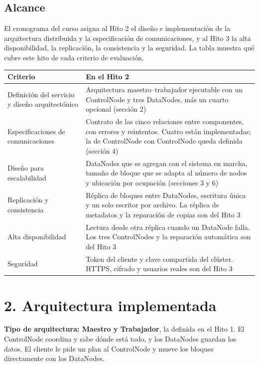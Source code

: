 \documentclass[10pt]{article}
\begin{document}
\subsection{Alcance}

El cronograma del curso asigna al Hito 2 el diseño e implementación de la arquitectura distribuida y la especificación de comunicaciones, y al Hito 3 la alta disponibilidad, la replicación, la consistencia y la seguridad. La tabla muestra qué cubre este hito de cada criterio de evaluación.

\begin{xltabular}{\linewidth}{@{}L{4.3cm}Y@{}}
\toprule
Criterio & En el Hito 2 \\
\midrule\endhead
Definición del servicio y diseño arquitectónico & Arquitectura maestro--trabajador ejecutable con un ControlNode y tres DataNodes, más un cuarto opcional (sección 2) \\
Especificaciones de comunicaciones & Contrato de las cinco relaciones entre componentes, con errores y reintentos. Cuatro están implementadas; la de ControlNode con ControlNode queda definida (sección 4) \\
Diseño para escalabilidad & DataNodes que se agregan con el sistema en marcha, tamaño de bloque que se adapta al número de nodos y ubicación por ocupación (secciones 3 y 6) \\
Replicación y consistencia & Réplica de bloques entre DataNodes, escritura única y un solo escritor por archivo. La réplica de metadatos y la reparación de copias son del Hito 3 \\
Alta disponibilidad & Lectura desde otra réplica cuando un DataNode falla. Los tres ControlNodes y la reparación automática son del Hito 3 \\
Seguridad & Token del cliente y clave compartida del clúster. HTTPS, cifrado y usuarios reales son del Hito 3 \\
\bottomrule
\end{xltabular}

\separador

\section{2. Arquitectura implementada}

\textbf{Tipo de arquitectura: Maestro y Trabajador}, la definida en el Hito 1. El ControlNode coordina y sabe dónde está todo, y los DataNodes guardan los datos. El cliente le pide un plan al ControlNode y mueve los bloques directamente con los DataNodes.
\end{document}
